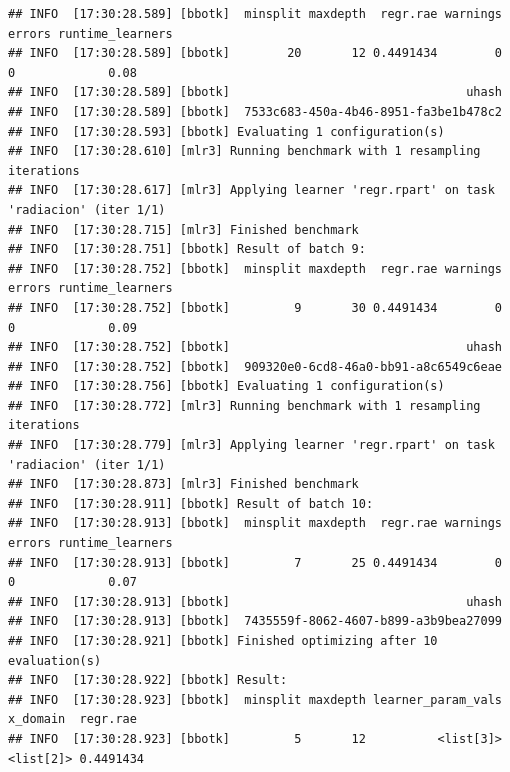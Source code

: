 \documentclass[
  11pt,
  a4paper,
]{article}
\newenvironment{Shaded}{\begin{snugshade}}{\end{snugshade}}
\newcommand{\CommentTok}[1]{\textcolor[rgb]{0.56,0.35,0.01}{\textit{#1}}}
\newcommand{\DecValTok}[1]{\textcolor[rgb]{0.00,0.00,0.81}{#1}}
\newcommand{\FunctionTok}[1]{\textcolor[rgb]{0.00,0.00,0.00}{#1}}
\newcommand{\NormalTok}[1]{#1}
\newcommand{\OtherTok}[1]{\textcolor[rgb]{0.56,0.35,0.01}{#1}}
\newcommand{\SpecialCharTok}[1]{\textcolor[rgb]{0.00,0.00,0.00}{#1}}
\begin{document}
\begin{verbatim}
## INFO  [17:30:28.589] [bbotk]  minsplit maxdepth  regr.rae warnings errors runtime_learners
## INFO  [17:30:28.589] [bbotk]        20       12 0.4491434        0      0             0.08
## INFO  [17:30:28.589] [bbotk]                                 uhash
## INFO  [17:30:28.589] [bbotk]  7533c683-450a-4b46-8951-fa3be1b478c2
## INFO  [17:30:28.593] [bbotk] Evaluating 1 configuration(s)
## INFO  [17:30:28.610] [mlr3] Running benchmark with 1 resampling iterations
## INFO  [17:30:28.617] [mlr3] Applying learner 'regr.rpart' on task 'radiacion' (iter 1/1)
## INFO  [17:30:28.715] [mlr3] Finished benchmark
## INFO  [17:30:28.751] [bbotk] Result of batch 9:
## INFO  [17:30:28.752] [bbotk]  minsplit maxdepth  regr.rae warnings errors runtime_learners
## INFO  [17:30:28.752] [bbotk]         9       30 0.4491434        0      0             0.09
## INFO  [17:30:28.752] [bbotk]                                 uhash
## INFO  [17:30:28.752] [bbotk]  909320e0-6cd8-46a0-bb91-a8c6549c6eae
## INFO  [17:30:28.756] [bbotk] Evaluating 1 configuration(s)
## INFO  [17:30:28.772] [mlr3] Running benchmark with 1 resampling iterations
## INFO  [17:30:28.779] [mlr3] Applying learner 'regr.rpart' on task 'radiacion' (iter 1/1)
## INFO  [17:30:28.873] [mlr3] Finished benchmark
## INFO  [17:30:28.911] [bbotk] Result of batch 10:
## INFO  [17:30:28.913] [bbotk]  minsplit maxdepth  regr.rae warnings errors runtime_learners
## INFO  [17:30:28.913] [bbotk]         7       25 0.4491434        0      0             0.07
## INFO  [17:30:28.913] [bbotk]                                 uhash
## INFO  [17:30:28.913] [bbotk]  7435559f-8062-4607-b899-a3b9bea27099
## INFO  [17:30:28.921] [bbotk] Finished optimizing after 10 evaluation(s)
## INFO  [17:30:28.922] [bbotk] Result:
## INFO  [17:30:28.923] [bbotk]  minsplit maxdepth learner_param_vals  x_domain  regr.rae
## INFO  [17:30:28.923] [bbotk]         5       12          <list[3]> <list[2]> 0.4491434
\end{verbatim}

\begin{Shaded}
\end{Shaded}
\end{document}

